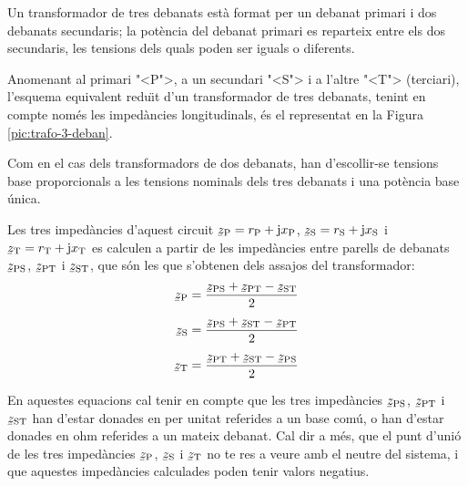 Un transformador de tres debanats est\`{a} format per un debanat primari i dos debanats secundaris; la pot\`{e}ncia del debanat primari es reparteix entre els dos secundaris, les tensions dels quals poden ser iguals o diferents.

Anomenant al primari {"<}P{">}, a un secundari {"<}S{">} i a l'altre {"<}T{">} (terciari), l'esquema equivalent redu\"{\i}t d'un transformador de tres debanats, tenint en compte nom\'{e}s les imped\`{a}ncies longitudinals,  \'{e}s el representat en la Figura \vref{pic:trafo-3-deban}.

\begin{center}
    
    \label{pic:trafo-3-deban}
\end{center}

Com en el cas dels transformadors de dos debanats, han d'escollir-se tensions base proporcionals a les tensions nominals dels tres debanats i una pot\`{e}ncia base \'{u}nica.

Les tres imped\`{a}ncies d'aquest circuit $\cmplx{z}\ped{P} = r\ped{P} + \ju x\ped{P}$, $\cmplx{z}\ped{S} = r\ped{S} + \ju x\ped{S}$ i $\cmplx{z}\ped{T} = r\ped{T} + \ju x\ped{T}$ es calculen a partir de les imped\`{a}ncies entre parells de debanats $\cmplx{z}\ped{PS}$, $\cmplx{z}\ped{PT}$ i $\cmplx{z}\ped{ST}$, que s\'{o}n les que s'obtenen dels assajos del transformador:
\begin{subequations}
\begin{align}
    \cmplx{z}\ped{P} &= \frac{\cmplx{z}\ped{PS}+\cmplx{z}\ped{PT}-\cmplx{z}\ped{ST}}{2}  \\[1ex]
    \cmplx{z}\ped{S} &= \frac{\cmplx{z}\ped{PS}+\cmplx{z}\ped{ST}-\cmplx{z}\ped{PT}}{2}  \\[1ex]
    \cmplx{z}\ped{T} &= \frac{\cmplx{z}\ped{PT}+\cmplx{z}\ped{ST}-\cmplx{z}\ped{PS}}{2}
\end{align}
\end{subequations}

En aquestes equacions cal tenir en compte que les tres imped\`{a}ncies $\cmplx{z}\ped{PS}$, $\cmplx{z}\ped{PT}$ i $\cmplx{z}\ped{ST}$ han d'estar donades en per unitat referides a un base com\'{u}, o han d'estar donades en ohm referides a un mateix debanat. Cal dir a m\'{e}s, que el punt d'uni\'{o} de les tres imped\`{a}ncies $\cmplx{z}\ped{P}$, $\cmplx{z}\ped{S}$ i $\cmplx{z}\ped{T}$ no te res a veure amb el neutre del sistema, i que aquestes imped\`{a}ncies calculades poden tenir valors  negatius.


